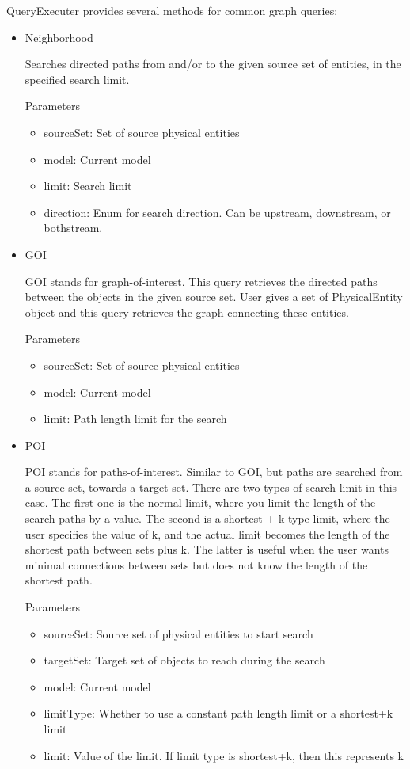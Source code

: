\documentclass{tufte-book}
\begin{document}
QueryExecuter provides several methods for common graph queries:
\begin{itemize}
\item Neighborhood

Searches directed paths from and/or to the given source set of entities, in the specified search limit.

Parameters

\begin{itemize}
\item sourceSet: Set of source physical entities
\item model: Current model
\item limit: Search limit
\item direction:  Enum for search direction. Can be upstream, downstream, or bothstream.
\end{itemize}

\item GOI

GOI stands for graph-of-interest. This query retrieves the directed paths between the objects in the given source set. User gives a set of PhysicalEntity object and this query retrieves the graph connecting these entities.

Parameters

\begin{itemize}
\item sourceSet: Set of source physical entities
\item model: Current model
\item limit: Path length limit for the search
\end{itemize}


\item POI 

POI stands for paths-of-interest. Similar to GOI, but paths are searched from a source set, towards a target set. There are two types of search limit in this case. The first one is the normal limit, where you limit the length of the search paths by a value. The second is a shortest + k type limit, where the user specifies the value of k, and the actual limit becomes the length of the shortest path between sets plus k. The latter is useful when the user wants minimal connections between sets but does not know the length of the shortest path.

Parameters

\begin{itemize}
\item sourceSet: Source set of physical entities to start search
\item targetSet: Target set of objects to reach during the search
\item model: Current model
\item limitType: Whether to use a constant path length limit or a shortest+k limit
\item limit: Value of the limit. If limit type is shortest+k, then this represents k
\end{itemize}



\end{itemize}
\end{document}
